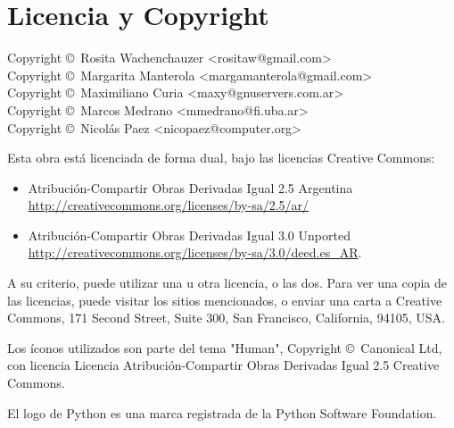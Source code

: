 
\chapter[Licencia y Copyright]{Licencia y Copyright}

{\noindent
Copyright \copyright\ Rosita Wachenchauzer <rositaw@gmail.com> \\
Copyright \copyright\ Margarita Manterola <margamanterola@gmail.com> \\
Copyright \copyright\ Maximiliano Curia <maxy@gnuservers.com.ar> \\
Copyright \copyright\ Marcos Medrano  <mmedrano@fi.uba.ar> \\
Copyright \copyright\ Nicolás Paez <nicopaez@computer.org> \\
}

Esta obra está licenciada de forma dual, bajo las licencias Creative
Commons:

\begin{itemize}
 \item Atribución-Compartir Obras Derivadas Igual 2.5 Argentina \\
       \url{http://creativecommons.org/licenses/by-sa/2.5/ar/}
 \item Atribución-Compartir Obras Derivadas Igual 3.0 Unported \\
       \url{http://creativecommons.org/licenses/by-sa/3.0/deed.es\_AR}.
\end{itemize}

A su criterio, puede utilizar una u otra licencia, o las dos.
Para ver una copia de las licencias, puede visitar los sitios
mencionados, o enviar una carta a Creative Commons,
171 Second Street, Suite 300, San Francisco, California, 94105, USA.

Los íconos utilizados son parte del tema "Human", Copyright \copyright\ Canonical
Ltd, con licencia Licencia Atribución-Compartir Obras Derivadas Igual 2.5
Creative Commons.

El logo de Python es una marca registrada de la Python Software Foundation.

